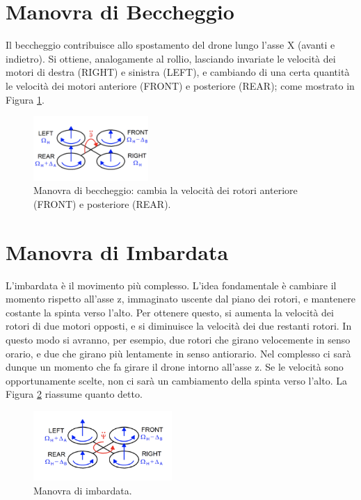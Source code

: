 \section*{Manovra di Beccheggio}
Il beccheggio contribuisce allo spostamento del drone lungo l'asse X (avanti e indietro). Si ottiene, analogamente al rollio, lasciando invariate le velocità dei motori di destra (RIGHT) e sinistra (LEFT), e cambiando di una certa quantità le velocità dei motori anteriore (FRONT) e posteriore (REAR); come mostrato in Figura \ref{fig:pitch_quad}.

\begin{figure}[H]
    \centering
    \includegraphics[width=0.39\textwidth]{gfx/pitch_quad}
    \caption[Manovra di beccheggio di un quadrirotore.]{Manovra di beccheggio: cambia la velocità dei rotori anteriore (FRONT) e posteriore (REAR).}
    \label{fig:pitch_quad}
\end{figure}

\pagebreak

\section*{Manovra di Imbardata}
L'imbardata è il movimento più complesso. L’idea fondamentale è cambiare il momento rispetto all’asse z, immaginato uscente dal piano dei rotori, e mantenere costante la spinta verso l’alto. Per ottenere questo, si aumenta la velocità dei rotori di due motori opposti, e si diminuisce la velocità dei due restanti rotori. In questo modo si avranno, per esempio, due rotori che girano velocemente in senso orario, e due che girano più lentamente in senso antiorario. Nel complesso ci sarà dunque un momento che fa girare il drone intorno all’asse z. Se le velocità sono opportunamente scelte, non ci sarà un cambiamento della spinta verso l’alto. La Figura \ref{fig:yaw_quad} riassume quanto detto.

\begin{figure}[H]
    \centering
    \includegraphics[width=0.47\textwidth]{gfx/yaw_quad}
    \caption[Manovra di imbardata di un quadrirotorre.]{Manovra di imbardata.}
    \label{fig:yaw_quad}
\end{figure}

